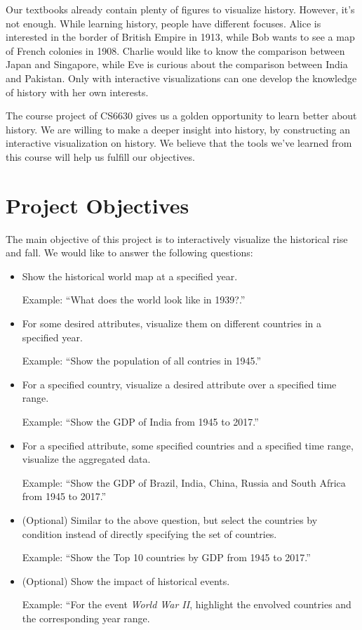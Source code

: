 \documentclass[12pt, fullpage,letterpaper]{article}
\begin{document}
Our textbooks already contain plenty of figures to visualize history. However,
it's not enough. While learning history, people have different focuses.  Alice
is interested in the border of British Empire in 1913, while Bob wants to see a
map of French colonies in 1908. Charlie would like to know the comparison
between Japan and Singapore, while Eve is curious about the comparison between
India and Pakistan.  Only with interactive visualizations can one develop the
knowledge of history with her own interests.

The course project of CS6630 gives us a golden opportunity to learn better
about history.  We are willing to make a deeper insight into history, by
constructing an interactive visualization on history. We believe that the tools
we've learned from this course will help us fulfill our objectives.


\section{Project Objectives}
The main objective of this project is to interactively visualize the historical rise
and fall.  We would like to answer the following questions:
\begin{itemize}
    \item Show the historical world map at a specified year.

        Example: ``What does the world look like in 1939?.''

    \item For some desired attributes, visualize them on different countries in a specified year.

        Example: ``Show the population of all contries in 1945.''

    \item For a specified country, visualize a desired attribute over a specified time range.

        Example: ``Show the GDP of India from 1945 to 2017.''

    \item For a specified attribute, some specified countries and a specified time range, visualize the aggregated data.

        Example: ``Show the GDP of Brazil, India, China, Russia and South Africa from 1945 to 2017.''

    \item (Optional) Similar to the above question, but select the countries by condition instead of directly specifying the set of countries.

        Example: ``Show the Top 10 countries by GDP from 1945 to 2017.''

    \item (Optional) Show the impact of historical events.

        Example: ``For the event \emph{World War II}, highlight the envolved countries and the corresponding year range.
\end{itemize}
\end{document}
